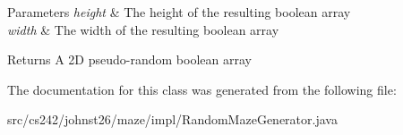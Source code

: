 \begin{DoxyParams}{Parameters}
{\em height} & The height of the resulting boolean array \\
\hline
{\em width} & The width of the resulting boolean array \\
\hline
\end{DoxyParams}
\begin{DoxyReturn}{Returns}
A 2\-D pseudo-\/random boolean array 
\end{DoxyReturn}


The documentation for this class was generated from the following file\-:\begin{DoxyCompactItemize}
\item 
src/cs242/johnst26/maze/impl/Random\-Maze\-Generator.\-java\end{DoxyCompactItemize}
